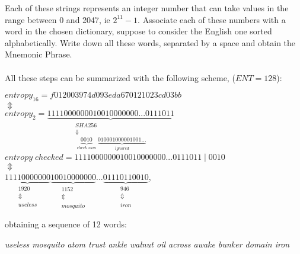 Each of these strings represents an integer number that can take values in the range between 0 and 2047, ie $2^{11}-1$. Associate each of these numbers with a word in the chosen dictionary, suppose to consider the English one sorted alphabetically. Write down all these words, separated by a space and obtain the Mnemonic Phrase.
\\ \\
All these steps can be summarized with the following scheme, ($ENT=128$):
\begin{center} 
	$ entropy_{16} = f012003974d093eda670121023cd03bb $ 
	\\
	$\Updownarrow $
	\\
	$entropy_{2}= \underbrace{1111000000010010000000...0111011}_{\substack{SHA256\\ \Downarrow\\ \underbrace{0010}_{\substack{check \;sum}}\underbrace{010001000001001...}_{\substack{ignored}}} } $
	\\
	$ $
	\\
	$entropy\;checked = 11110000000 10010000000...0111011\; | \; 0010$
	\\
	$\Updownarrow $
	\\
	$\underbrace{11110000000}_{\substack{1920 \\ \Updownarrow\\ useless} }
	\underbrace{10010000000}_{\substack{1152 \\ \Updownarrow\\ mosquito}}
	...
	\underbrace{01110110010}_{\substack{946 \\ \Updownarrow\\ iron}}
	$,
\end{center}
obtaining a sequence of 12 words:
\begin{center}
	\textit{useless mosquito atom trust ankle walnut oil across awake bunker domain iron}
\end{center}


